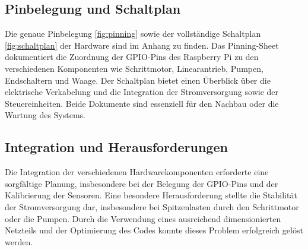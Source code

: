 \subsection{Pinbelegung und Schaltplan}
Die genaue Pinbelegung \ref{fig:pinning} sowie der vollständige Schaltplan \ref{fig:schaltplan} 
der Hardware sind im Anhang zu finden. Das Pinning-Sheet dokumentiert die Zuordnung der GPIO-Pins 
des Raspberry Pi zu den verschiedenen Komponenten wie Schrittmotor, Linearantrieb, Pumpen, 
Endschaltern und Waage. Der Schaltplan bietet einen Überblick über die elektrische Verkabelung und 
die Integration der Stromversorgung sowie der Steuereinheiten. Beide Dokumente sind essenziell für 
den Nachbau oder die Wartung des Systems.

\subsection{Integration und Herausforderungen}
Die Integration der verschiedenen Hardwarekomponenten erforderte eine sorgfältige Planung, 
insbesondere bei der Belegung der GPIO-Pins und der Kalibrierung der Sensoren. Eine besondere 
Herausforderung stellte die Stabilität der Stromversorgung dar, insbesondere bei Spitzenlasten 
durch den Schrittmotor oder die Pumpen. Durch die Verwendung eines ausreichend dimensionierten 
Netzteils und der Optimierung des Codes konnte dieses Problem erfolgreich gelöst werden.
